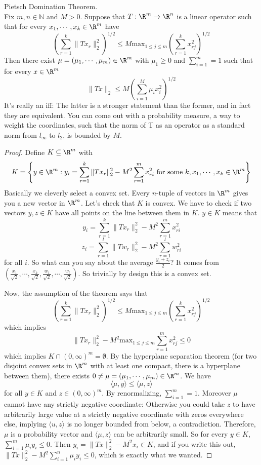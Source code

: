 \begin{thm} Pietsch Domination Theorem. \\
Fix $m, n \in \mathbb{N}$ and $M  > 0$. Suppose that $T: \R^m \to \R^n$ is a linear operator such that for every $x_1, \cdots, x_k \in \R^m$ have 
\[
\left(\sum_{r = 1}^k \|Tx_r\|_2^2\right)^{1/2} \leq M \text{max}_{1 \leq j \leq m} \left(\sum_{r = 1}^k x_{rj}^2\right)^{1/2}
\]
Then there exist $\mu = (\mu_1, \cdots, \mu_m) \in \R^m$ with $\mu_1 \geq 0$ and $\sum_{i = 1}^m = 1$ such that for every $x \in \R^m$
\[
\|Tx\|_2 \leq M\left(\sum_{i = 1}^M \mu_ix_i^2\right)^{1/2}
\]
It's really an iff: The latter is a stronger statement than the former, and in fact they are equivalent.
You can come out with a probability measure, a way to weight the coordinates, such that the norm of T as an operator as a standard norm from $l_{\infty}$ to $l_2$, is bounded by $M$. 
\end{thm}
\begin{proof}
Define $K \subseteq \R^m$ with 
\[
K = \left\{y \in \R^m: y_i = \sum_{r = 1}^k \|Tx_r\|_2^2 - M^2\sum_{r = 1}^m x_{ri}^2 \text{ for some } k, x_1, \cdots, x_k \in \R^m\right\}
\]
Basically we cleverly select a convex set. Every $n$-tuple of vectors in $\R^m$ gives you a new vector in $\R^m$. Let's check that $K$ is convex. We have to check if two vectors $y, z \in K$ have all points on the line between them in $K$. $y \in K$ means that 
\[
y_i = \sum_{r = 1}^k \|Tx_r\|_2^2 - M^2 \sum_{r = 1}^m x_{ri}^2
\] 
\[
z_i = \sum_{r = 1}^l \|Tw_r\|_2^2 - M^2 \sum_{r = 1}^l w_{ri}^2
\]
for all $i$. So what can you say about the average $\frac{y_i + z_i}{2}$? It comes from $\left(\frac{x_1}{\sqrt{2}}, \cdots, \frac{x_k}{\sqrt{2}}, \frac{w_1}{\sqrt{2}}, \cdots, \frac{w_l}{\sqrt{2}}\right)$. So trivially by design this is a convex set. 

Now, the assumption of the theorem says that 
\[
\left(\sum_{r = 1}^k \|Tx_r\|_2^2\right)^{1/2} \leq M \text{max}_{1 \leq j \leq m} \left(\sum_{r = 1}^k x_{rj}^2\right)^{1/2}
\]
which implies 
\[
\|Tx_r\|_2^2 - M^2 \text{max}_{1 \leq j \leq m} \sum_{r = 1}^m x_{rj}^2 \leq 0
\]
which implies $K \cap (0, \infty)^m = \emptyset$. By the hyperplane separation theorem (for two disjoint convex sets in $\R^m$ with at least one compact, there is a hyperplane between them), there exists $0 \neq \mu = (\mu_1, \cdots, \mu_m) \in \R^m$. We have 
\[
\langle \mu, y \rangle \leq \langle \mu, z\rangle
\]
for all $y \in K$ and $z \in (0, \infty)^m$. By renormalizing, $\sum_{i = 1}^m = 1$. Moreover $\mu$ cannot have any strictly negative coordinate: Otherwise you could take $z$ to have arbitrarily large value at a strictly negative coordinate with zeros everywhere else, implying $\langle u, z \rangle$ is no longer bounded from below, a contradiction. Therefore, $\mu$ is a probability vector and $\langle \mu, z \rangle$ can be arbitrarily small. So for every $y \in K$, $\sum_{i = 1}^m \mu_iy_i \leq 0$. Then $y_i = \|Tx\|_2^2 - M^2x_i \in K$, and if you write this out, $\|Tx\|_2^2 - M^2 \sum_{i = 1}^n \mu_i y_i \leq 0$, which is exactly what we wanted. 
\end{proof}

